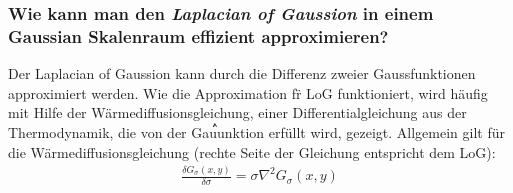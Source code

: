 \subsubsection*{Wie kann man den \emph{Laplacian of Gaussion} in einem Gaussian Skalenraum effizient approximieren?}
Der Laplacian of Gaussion kann durch die Differenz zweier Gaussfunktionen approximiert werden. Wie die Approximation f\"r LoG funktioniert, wird h\"aufig mit Hilfe der W\"armediffusionsgleichung, einer Differentialgleichung aus der Thermodynamik, die von der Gauࠦunktion erf\"ullt wird, gezeigt. Allgemein gilt f\"ur die W\"armediffusionsgleichung (rechte Seite der Gleichung entspricht dem LoG):
\begin{align*}
\frac{\delta G_\sigma(x,y)}{\delta \sigma} = \sigma \nabla^2 G_\sigma (x,y)
\end{align*}